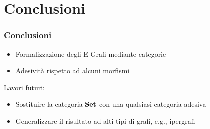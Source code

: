 \documentclass[8pt]{beamer}
\begin{document}
\section{Conclusioni}
\begin{frame}\frametitle{Conclusioni}
	\begin{itemize}
		\item Formalizzazione degli E-Grafi mediante categorie
		\item Adesività rispetto ad alcuni morfismi
	\end{itemize}

	Lavori futuri: \begin{itemize}
		\item Sostituire la categoria $\mathbf{Set}$ con una qualsiasi categoria adesiva
		\item Generalizzare il risultato ad alti tipi di grafi, e.g., ipergrafi
	\end{itemize}
\end{frame}
\end{document}
